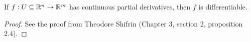 

\begin{proposition}
  If $f: U \subseteq \mathbb{R}^n \rightarrow \mathbb{R}^m$ has continuous partial derivatives, then $f$ is differentiable.  
\end{proposition}
\begin{proof}
  See the proof from Theodore Shifrin \cite{shifrin} (Chapter 3, section 2, proposition 2.4). 
\end{proof}

